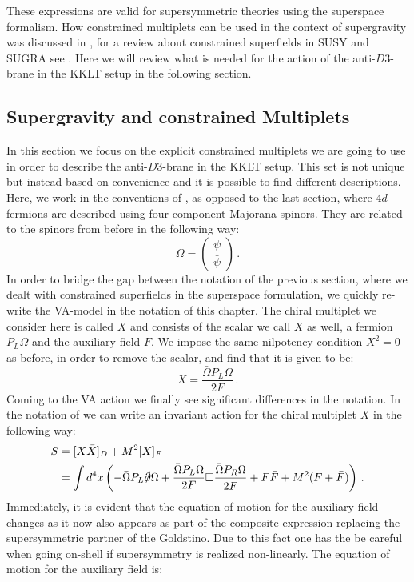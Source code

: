 \documentclass[a4paper,12pt]{report}
\newcommand{\be}{\begin{equation}}
\newcommand{\ee}{\end{equation}}
\newcommand{\bea}{\begin{equation}\begin{aligned}}
\newcommand{\eea}{\end{aligned}\end{equation}}
\begin{document}
These expressions are valid for supersymmetric theories using the superspace formalism. How constrained multiplets can be used in the context of supergravity was discussed in \cite{DallAgata:2015zxp}, for a review about constrained superfields in SUSY and SUGRA see \cite{Cribiori:2018hxv}. Here we will review what is needed for the action of the anti-$D3$-brane in the KKLT setup in the following section.

\subsection{Supergravity and constrained Multiplets}%
In this section we focus on the explicit constrained multiplets we are going to use in order to describe the anti-$D3$-brane in the KKLT setup. This set is not unique but instead based on convenience and it is possible to find different descriptions. Here, we work in the conventions of \cite{Freedman:2012zz}, as opposed to the last section, where $4d$ fermions are described using four-component Majorana spinors. They are related to the spinors from before in the following way:
\be 
\Omega = \begin{pmatrix} \psi \\ \bar{\psi}\end{pmatrix}\,.
\ee
In order to bridge the gap between the notation of the previous section, where we dealt with constrained superfields in the superspace formulation, we quickly re-write the VA-model in the notation of this chapter. The chiral multiplet we consider here is called $X$ and consists of the scalar we call $X$ as well, a fermion $P_L \Omega$ and the auxiliary field $F$. We impose the same nilpotency condition $X^2=0$ as before, in order to remove the scalar, and find that it is given to be:
\be 
X = \frac{\bar{\Omega} P_L \Omega}{2F}\,.
\ee
Coming to the VA action we finally see significant differences in the notation. In the notation of \cite{Freedman:2012zz} we can write an invariant action for the chiral multiplet $X$ in the following way:
\bea 
S &= [X\bar{X}]_D + M^2 [X]_F\\
  &= \int d^4 x \left( - \bar{\Omega} P_L \slashed{\partial}\Omega + \frac{\bar{\Omega}P_L\Omega}{2F} \square \frac{\bar{\Omega}P_R\Omega}{2\bar{F}} + F \bar{F} + M^2 (F+\bar{F})\right)\,.
\label{eq:VAsusy}
\eea
Immediately, it is evident that the equation of motion for the auxiliary field changes as it now also appears as part of the composite expression replacing the supersymmetric partner of the Goldstino. Due to this fact one has the be careful when going on-shell if supersymmetry is realized non-linearly. The equation of motion for the auxiliary field is:
\end{document}
